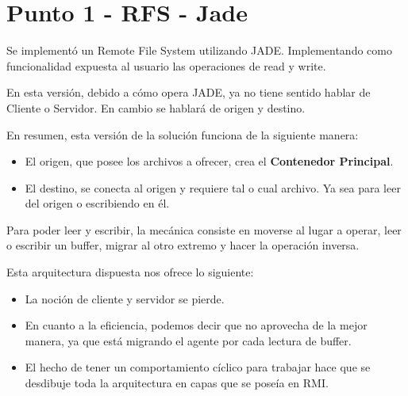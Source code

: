 






\clearpage
\tableofcontents
\clearpage 

\lstset{style=MyStyle}

\section{Punto 1 - RFS - Jade}

Se implementó un Remote File System utilizando JADE. Implementando como funcionalidad expuesta al usuario las operaciones de read y write.

En esta versión, debido a cómo opera JADE, ya no tiene sentido hablar de Cliente o Servidor. En cambio se hablará de origen y destino.

En resumen, esta versión de la solución funciona de la siguiente manera:

\begin{itemize}
    \item El origen, que posee los archivos a ofrecer, crea el \textbf{Contenedor Principal}.
    \item El destino, se conecta al origen y requiere tal o cual archivo. Ya sea para leer del origen o escribiendo en él.
\end{itemize}

Para poder leer y escribir, la mecánica consiste en moverse al lugar a operar, leer o escribir un buffer, migrar al otro extremo y hacer la operación inversa.

Esta arquitectura dispuesta nos ofrece lo siguiente:

\begin{itemize}
    \item La noción de cliente y servidor se pierde.
    \item En cuanto a la eficiencia, podemos decir que no aprovecha de la mejor manera, ya que está migrando el agente por cada lectura de buffer.
    \item El hecho de tener un comportamiento cíclico para trabajar hace que se desdibuje toda la arquitectura en capas que se poseía en RMI.
\end{itemize}

